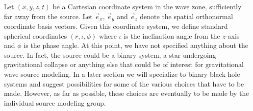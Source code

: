\documentclass{article}
\numberwithin{equation}{section}
\newcommand{\xhat}{\vec{e}_x}
\newcommand{\yhat}{\vec{e}_y}
\newcommand{\zhat}{\vec{e}_z}
\begin{document}
Let $(x,y,z,t)$ be a Cartesian coordinate system in the wave zone,
sufficiently far away from the source. Let $\xhat$, $\yhat$ and
$\zhat$ denote the spatial orthonormal coordinate basis vectors.
Given this coordinate system, we define standard spherical coordinates
$(r,\iota,\phi)$ where $\iota$ is the inclination angle from the
$z$-axis and $\phi$ is the phase angle.  At this point, we have not
specified anything about the source.  In fact, the source could be a
binary system, a star undergoing gravitational collapse or anything
else that could be of interest for gravitational wave source modeling.
In a later section we will specialize to binary black hole systems and
suggest possibilities for some of the various choices that have to be
made.  However, as far as possible, these choices are eventually to be
made by the individual source modeling group.
\end{document}
